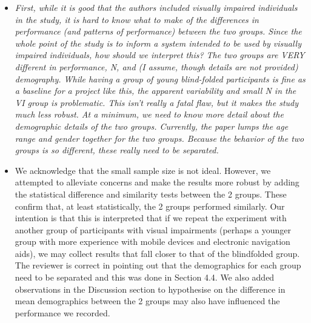 \documentclass{scrartcl}
\begin{document}
\begin{itemize}
  \item \textit{First, while it is good that the authors included visually impaired individuals in the study, it is hard to know what to make of the differences in performance (and patterns of performance) between the two groups. Since the whole point of the study is to inform a system intended to be used by visually impaired individuals, how should we interpret this? The two groups are VERY different in performance, N, and (I assume, though details are not provided) demography. While having a group of young blind-folded participants is fine as a baseline for a project like this, the apparent variability and small N in the VI group is problematic. This isn’t really a fatal flaw, but it makes the study much less robust. At a minimum, we need to know more detail about the demographic details of the two groups. Currently, the paper lumps the age range and gender together for the two groups. Because the behavior of the two groups is so different, these really need to be separated.}
  \item We acknowledge that the small sample size is not ideal.
    However, we attempted to alleviate concerns and make the results more robust by adding the statistical difference and similarity tests between the 2 groups.
    These confirm that, at least statistically, the 2 groups performed similarly.
    Our intention is that this is interpreted that if we repeat the experiment with another group of participants with visual impairments (perhaps a younger group with more experience with mobile devices and electronic navigation aids), we may collect results that fall closer to that of the blindfolded group.
    The reviewer is correct in pointing out that the demographics for each group need to be separated and this was done in Section 4.4.
    We also added observations in the Discussion section to hypothesise on the difference in mean demographics between the 2 groups may also have influenced the performance we recorded. 


\end{itemize}
\end{document}
